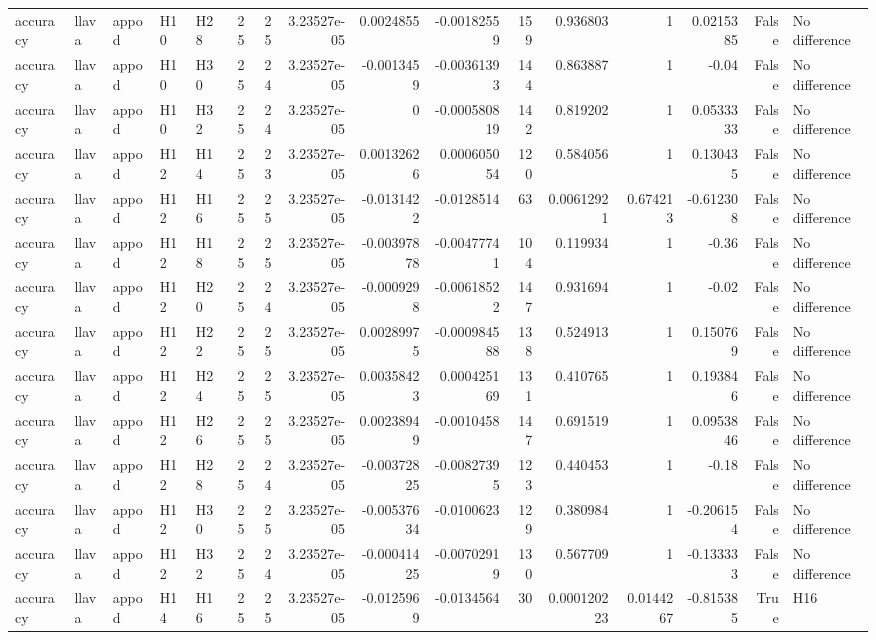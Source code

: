 \begin{longtable}{lllllrrrrrrrrrrl}
accuracy & llava & appod & H10 & H28 & 25 & 25 & 3.23527e-05 & 0.0024855 & -0.00182559 & 159 & 0.936803 & 1 & 0.0215385 & False & No difference \\
accuracy & llava & appod & H10 & H30 & 25 & 24 & 3.23527e-05 & -0.0013459 & -0.00361393 & 144 & 0.863887 & 1 & -0.04 & False & No difference \\
accuracy & llava & appod & H10 & H32 & 25 & 24 & 3.23527e-05 & 0 & -0.000580819 & 142 & 0.819202 & 1 & 0.0533333 & False & No difference \\
accuracy & llava & appod & H12 & H14 & 25 & 23 & 3.23527e-05 & 0.00132626 & 0.000605054 & 120 & 0.584056 & 1 & 0.130435 & False & No difference \\
accuracy & llava & appod & H12 & H16 & 25 & 25 & 3.23527e-05 & -0.0131422 & -0.0128514 & 63 & 0.00612921 & 0.674213 & -0.612308 & False & No difference \\
accuracy & llava & appod & H12 & H18 & 25 & 25 & 3.23527e-05 & -0.00397878 & -0.00477741 & 104 & 0.119934 & 1 & -0.36 & False & No difference \\
accuracy & llava & appod & H12 & H20 & 25 & 24 & 3.23527e-05 & -0.0009298 & -0.00618522 & 147 & 0.931694 & 1 & -0.02 & False & No difference \\
accuracy & llava & appod & H12 & H22 & 25 & 25 & 3.23527e-05 & 0.00289975 & -0.000984588 & 138 & 0.524913 & 1 & 0.150769 & False & No difference \\
accuracy & llava & appod & H12 & H24 & 25 & 25 & 3.23527e-05 & 0.00358423 & 0.000425169 & 131 & 0.410765 & 1 & 0.193846 & False & No difference \\
accuracy & llava & appod & H12 & H26 & 25 & 25 & 3.23527e-05 & 0.00238949 & -0.0010458 & 147 & 0.691519 & 1 & 0.0953846 & False & No difference \\
accuracy & llava & appod & H12 & H28 & 25 & 24 & 3.23527e-05 & -0.00372825 & -0.00827395 & 123 & 0.440453 & 1 & -0.18 & False & No difference \\
accuracy & llava & appod & H12 & H30 & 25 & 25 & 3.23527e-05 & -0.00537634 & -0.0100623 & 129 & 0.380984 & 1 & -0.206154 & False & No difference \\
accuracy & llava & appod & H12 & H32 & 25 & 24 & 3.23527e-05 & -0.00041425 & -0.00702919 & 130 & 0.567709 & 1 & -0.133333 & False & No difference \\
accuracy & llava & appod & H14 & H16 & 25 & 25 & 3.23527e-05 & -0.0125969 & -0.0134564 & 30 & 0.000120223 & 0.0144267 & -0.815385 & True & H16 \\

\end{longtable}
